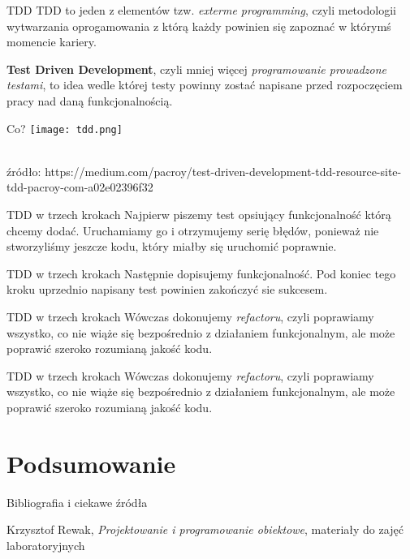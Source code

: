 \begin{frame}[fragile]{TDD}
	TDD to jeden z elementów tzw. \emph{exterme programming}, czyli metodologii wytwarzania oprogamowania z którą każdy powinien się zapoznać w którymś momencie kariery.
	
	\textbf{Test Driven Development}, czyli mniej więcej \emph{programowanie prowadzone testami}, to idea wedle której testy powinny zostać napisane przed rozpoczęciem pracy nad daną funkcjonalnością.
\end{frame}

\begin{frame}{Co?}
	\centering
	\texttt{[image: tdd.png]}
	
	\ \\
	
	źródło: https://medium.com/pacroy/test-driven-development-tdd-resource-site-tdd-pacroy-com-a02e02396f32
\end{frame}

\begin{frame}{TDD w trzech krokach}
	Najpierw piszemy test opsiujący funkcjonalność którą chcemy dodać. Uruchamiamy go i otrzymujemy serię błędów, ponieważ nie stworzyliśmy jeszcze kodu, który miałby się uruchomić poprawnie.
\end{frame}

\begin{frame}{TDD w trzech krokach}	
	Następnie dopisujemy funkcjonalność. Pod koniec tego kroku uprzednio napisany test powinien zakończyć sie sukcesem.
\end{frame}

\begin{frame}{TDD w trzech krokach}
	Wówczas dokonujemy \emph{refactoru}, czyli poprawiamy wszystko, co nie wiąże się bezpośrednio z działaniem funkcjonalnym, ale może poprawić szeroko rozumianą jakość kodu.
\end{frame}

\begin{frame}{TDD w trzech krokach}
	Wówczas dokonujemy \emph{refactoru}, czyli poprawiamy wszystko, co nie wiąże się bezpośrednio z działaniem funkcjonalnym, ale może poprawić szeroko rozumianą jakość kodu.
\end{frame}

\section{Podsumowanie}

\begin{frame}{Bibliografia i ciekawe źródła}
  
	\begin{thebibliography}{9}
	
		Krzysztof Rewak,
		\textit{Projektowanie i programowanie obiektowe},
		materiały do zajęć laboratoryjnych
	
	\end{thebibliography}

\end{frame}

